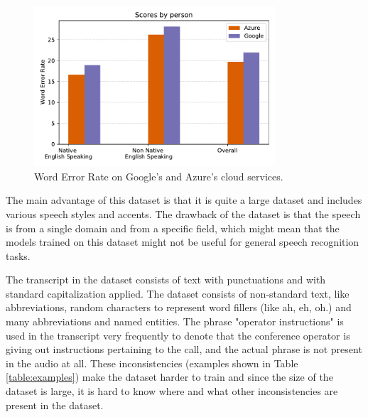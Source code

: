\begin{figure}[ht]
  \begin{center}
    \includegraphics[width=0.8\textwidth]{images/wer_cloud.pdf} 
    \caption{Word Error Rate on Google's and Azure's cloud services.}
    \label{fig:wer_cloud}
  \end{center}
\end{figure}


The main advantage of this dataset is that it is quite a large dataset and includes various speech styles and accents. The drawback of the dataset is that the speech is from a single domain and from a specific field, which might mean that the models trained on this dataset might not be useful for general speech recognition tasks.

The transcript in the dataset consists of text with punctuations and with standard capitalization applied. The dataset consists of non-standard text, like abbreviations, random characters to represent word fillers (like ah, eh, oh.) and many abbreviations and named entities. The phrase "operator instructions" is used in the transcript very frequently to denote that the conference operator is giving out instructions pertaining to the call, and the actual phrase is not present in the audio at all. These inconsistencies (examples shown in Table \ref{table:examples}) make the dataset harder to train and since the size of the dataset is large, it is hard to know where and what other inconsistencies are present in the dataset. 

